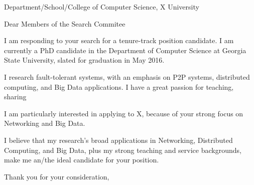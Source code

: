 \documentclass{letter}
\date{}
\begin{document}
 
\begin{letter}{Department/School/College of Computer Science, X University} 
\opening{Dear Members of the Search Commitee} 
 
I am responding to your search for a tenure-track position candidate.
I am currently a PhD candidate in the Department of Computer Science at Georgia State University, slated for graduation in May 2016.


I research fault-tolerant systems, with an emphasis  on P2P systems, distributed computing, and Big Data applications.
I have a great passion for teaching, sharing 


I am particularly interested in applying to X, because of your strong focus on Networking and Big Data.


I believe that my research's broad applications in Networking, Distributed Computing, and Big Data, plus my strong teaching and service backgrounds, make me an/the ideal candidate for your position.


\closing{Thank you for your consideration,} 
\end{letter} 
\end{document}
